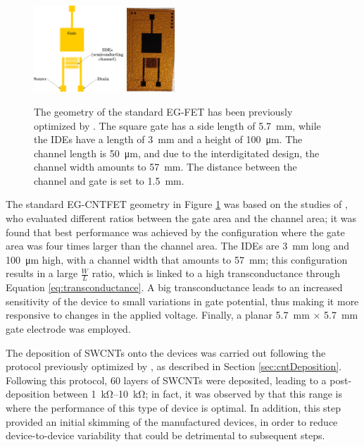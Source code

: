 \begin{figure}
    \centering
    \includegraphics[width=0.3\textwidth]{figures/chapter3/EGFET/standardEGFET_scheme.pdf}
    \quad
    \includegraphics[width=0.16\textwidth]{figures/chapter3/EGFET/standardEGFET.jpg}
    \caption{The geometry of the standard EG-FET has been previously optimized by \citet{joshiUnderstanding2018}. The square gate has a side length of \SI{5.7}{\mm}, while the IDEs have a length of \SI{3}{\mm} and a height of \SI{100}{\um}. The channel length is \SI{50}{\um}, and due to the interdigitated design, the channel width amounts to \SI{57}{\mm}. The distance between the channel and gate is set to \SI{1.5}{\mm}.}
    \label{fig:standardEGFET}
\end{figure}

The standard EG-CNTFET geometry in Figure \ref{fig:standardEGFET} was based on the studies of \citet{joshiUnderstanding2018}, who evaluated different ratios between the gate area and the channel area; it was found that best performance was achieved by the configuration where the gate area was four times larger than the channel area. The IDEs are \SI{3}{\mm} long and \SI{100}{\um} high, with a channel width that amounts to \SI{57}{\mm}; this configuration results in a large $\frac{W}{L}$ ratio, which is linked to a high transconductance through Equation \eqref{eq:transconductance}. A big transconductance leads to an increased sensitivity of the device to small variations in gate potential, thus making it more responsive to changes in the applied voltage. Finally, a planar \SI{5.7}{\mm} $\times$ \SI{5.7}{\mm} gate electrode was employed.

The deposition of SWCNTs onto the devices was carried out following the protocol previously optimized by \citet{shkodraOptimization2023}, as described in Section \ref{sec:cntDeposition}. Following this protocol, 60 layers of SWCNTs were deposited, leading to a post-deposition \rds{} between \SIrange{1}{10}{\kohm}; in fact, it was observed by \citet{petrelliMethod2023} that this range is where the performance of this type of device is optimal. In addition, this step provided an initial skimming of the manufactured devices, in order to reduce device-to-device variability that could be detrimental to subsequent steps.

